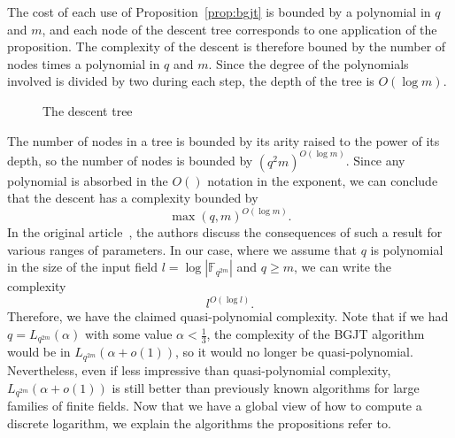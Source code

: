 \documentclass[a4paper,11pt]{article}
\theoremstyle{break}
\theoremstyle{sc}
\theoremstyle{definition}
\theoremstyle{remark}
\begin{document}
The cost of each use of Proposition~\ref{prop:bgjt} is bounded by a polynomial in $q$ and
$m$, and each node of the descent tree corresponds to one application of the
proposition. The complexity of the descent is therefore bouned by the number of
nodes times a polynomial in $q$ and $m$. Since the degree of the polynomials
involved is divided by two during each step, the depth of the tree is
$O(\log m)$.

\begin{figure}
  \centering
  \caption{The descent tree}
  \label{fig:tree}
\end{figure}

The number of nodes in a tree is bounded by its arity raised to the power
of its depth, so the number of nodes is bounded by $(q^2m)^{O(\log m)}$. Since
any polynomial is absorbed in the $O()$ notation in the exponent, we can
conclude that the descent has a complexity bounded by
\[
  \max(q, m)^{O(\log m)}.
\]
In the original article~\cite{BGJT13}, the authors discuss the consequences of
such a result for various ranges of parameters. In our case, where we assume
that $q$ is polynomial in the size of the input field $l=\log|\mathbb{F}_{q^{2m}}|$ and
$q\geq m$, we can write the complexity
\[
  l^{O(\log l)}.
\]
Therefore, we have the claimed quasi-polynomial complexity. Note that if we had
$q = L_{q^{2m}}(\alpha)$ with some value $\alpha<\frac{1}{3}$, the complexity of the BGJT
algorithm would be in
$L_{q^{2m}}(\alpha+o(1))$, so it would no longer be quasi-polynomial. Nevertheless, even if
less impressive than quasi-polynomial complexity, $L_{q^{2m}}(\alpha+o(1))$ is
still better than previously known algorithms for large families
of finite
fields. Now that we have a global view of how to compute a discrete logarithm,
we explain the algorithms the propositions refer to.
\end{document}
